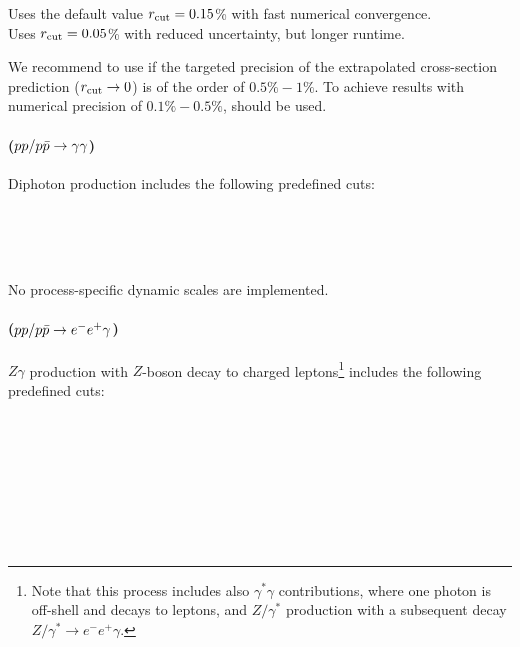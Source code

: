 \documentclass[english,11pt]{article}
\begin{document}
\quad Uses the default value $r_{\mathrm{cut}}{}=0.15$\% with fast numerical convergence.\\
\quad Uses $r_{\mathrm{cut}}{}=0.05$\% with reduced uncertainty, but longer runtime.

We recommend to use  if the targeted precision of the extrapolated cross-section prediction ($r_{\mathrm{cut}}\rightarrow0$) is of the order of $0.5\%-1\%$. To achieve results with numerical precision of $0.1\%-0.5\%$,  should be used.

\paragraph{ ($pp/p\bar{p}\to\gamma\gamma$)}
Diphoton production includes the following predefined cuts:

\\
\\
\\

No process-specific dynamic scales are implemented.

\paragraph{ ($pp/p\bar{p}\to e^-e^+\gamma$)}
$Z\gamma$ production \cite{Grazzini:2013bna,Grazzini:2015nwa} with $Z$-boson decay to 
charged leptons\footnote{Note that this process includes also $\gamma^\ast\gamma$ contributions, 
where one photon is off-shell and decays to leptons,
and $Z/\gamma^\ast$ production with a subsequent decay $Z/\gamma^\ast\to e^-e^+\gamma$.} 
includes the following predefined cuts:

\\
\\
\\
\\
\\
\\
\\
\end{document}
